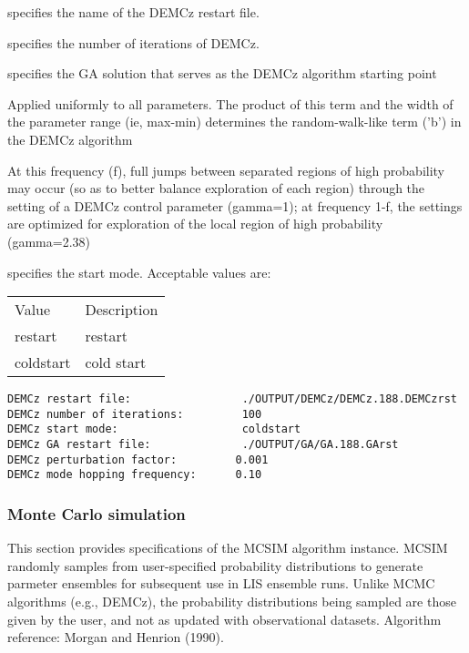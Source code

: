  
  specifies the name of the 
 DEMCz restart file.

  specifies the 
 number of iterations of DEMCz.

  specifies the GA solution
  that serves as the DEMCz algorithm starting point

  Applied uniformly to 
  all parameters.  The product of this term and the 
 width of the parameter range (ie, max-min) determines the random-walk-like term ('b') in the DEMCz algorithm 

  At this frequency (f), full jumps between separated regions of high probability 
 may occur (so as to better balance exploration of each region) through the setting of a DEMCz
 control parameter (gamma=1); at frequency 1-f, the settings are optimized for exploration of the local region of high probability (gamma=2.38) 

  specifies the start mode.
 Acceptable values are:

 \begin{tabular}{ll}
 Value     & Description \\
 restart   & restart     \\
 coldstart & cold start  \\
 \end{tabular}
 

 \begin{Verbatim}[frame=single]
DEMCz restart file:                 ./OUTPUT/DEMCz/DEMCz.188.DEMCzrst
DEMCz number of iterations:         100
DEMCz start mode:                   coldstart 
DEMCz GA restart file:              ./OUTPUT/GA/GA.188.GArst
DEMCz perturbation factor:         0.001
DEMCz mode hopping frequency:      0.10
 \end{Verbatim}

 
 \subsubsection{Monte Carlo simulation} \label{ssec:mcsim}
 This section provides specifications of the MCSIM algorithm instance.
 MCSIM randomly samples from user-specified probability distributions
 to generate parmeter ensembles for subsequent use in  LIS ensemble runs.
 Unlike MCMC algorithms (e.g., DEMCz), the probability distributions being sampled
 are those given by the user, and not as updated with observational datasets.
 Algorithm reference: Morgan and Henrion (1990).
 

